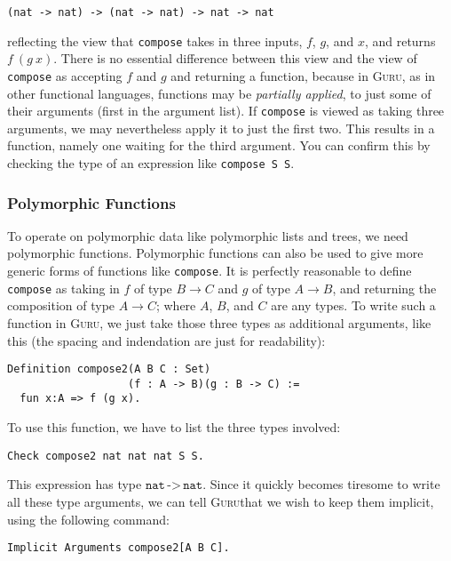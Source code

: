 \documentclass{book}[12pt]
\newcommand{\guru}[0]{\textsc{Guru}}
\begin{document}
\begin{verbatim}
(nat -> nat) -> (nat -> nat) -> nat -> nat
\end{verbatim}

\noindent reflecting the view that \texttt{compose} takes in three
inputs, $f$, $g$, and $x$, and returns $f\ (g\ x)$.  There is no
essential difference between this view and the view of
\texttt{compose} as accepting $f$ and $g$ and returning a function,
because in \guru, as in other functional languages, functions may be
\emph{partially applied}, to just some of their arguments (first in
the argument list).  If \texttt{compose} is viewed as taking three
arguments, we may nevertheless apply it to just the first two.  This
results in a function, namely one waiting for the third argument.
You can confirm this by checking the type of an expression like
\texttt{compose S S}.

\subsubsection{Polymorphic Functions}

To operate on polymorphic data like polymorphic lists and trees, we
need polymorphic functions.  Polymorphic functions can also be used to
give more generic forms of functions like \texttt{compose}.  It is
perfectly reasonable to define \texttt{compose} as taking in $f$ of
type $B \to C$ and $g$ of type $A \to B$, and returning the
composition of type $A \to C$; where $A$, $B$, and $C$ are any types.
To write such a function in \guru, we just take those three types as
additional arguments, like this (the spacing and indendation are just
for readability):

\begin{verbatim}
Definition compose2(A B C : Set)
                   (f : A -> B)(g : B -> C) := 
  fun x:A => f (g x).
\end{verbatim}

\noindent To use this function, we have to list the three types involved:

\begin{verbatim}
Check compose2 nat nat nat S S.
\end{verbatim}

\noindent This expression has type
$\texttt{nat}\,\texttt{->}\,\texttt{nat}$.  Since it quickly becomes
tiresome to write all these type arguments, we can tell \guru that we
wish to keep them implicit, using the following command:

\begin{verbatim}
Implicit Arguments compose2[A B C].
\end{verbatim}
\end{document}
